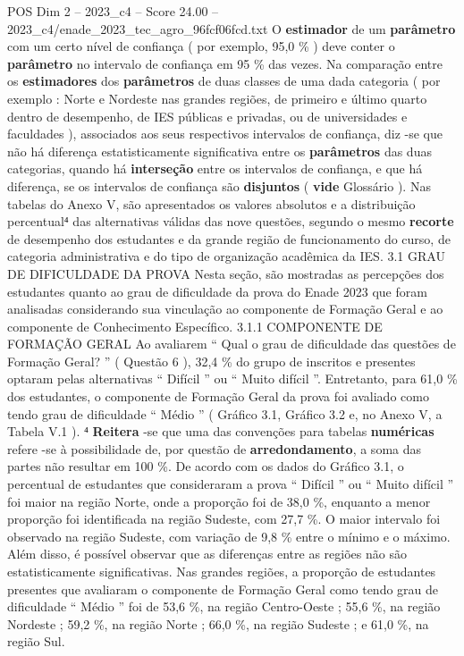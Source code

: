 \begin{textsample}{POS Dim 2 – 2023\_c4 – Score 24.00 – 2023\_c4/enade\_2023\_tec\_agro\_96fcf06fcd.txt}
O \textbf{estimador} de um \textbf{parâmetro} com um certo nível de confiança ( por exemplo, 95,0 \% ) deve conter o \textbf{parâmetro} no intervalo de confiança em 95 \% das vezes.
Na comparação entre os \textbf{estimadores} dos \textbf{parâmetros} de duas classes de uma dada categoria ( por exemplo : Norte e Nordeste nas grandes regiões, de primeiro e último quarto dentro de desempenho, de IES públicas e privadas, ou de universidades e faculdades ), associados aos seus respectivos intervalos de confiança, diz -se que não há diferença estatisticamente significativa entre os \textbf{parâmetros} das duas categorias, quando há \textbf{interseção} entre os intervalos de confiança, e que há diferença, se os intervalos de confiança são \textbf{disjuntos} ( \textbf{vide} Glossário ).
Nas tabelas do Anexo V, são apresentados os valores absolutos e a distribuição percentual⁴ das alternativas válidas das nove questões, segundo o mesmo \textbf{recorte} de desempenho dos estudantes e da grande região de funcionamento do curso, de categoria administrativa e do tipo de organização acadêmica da IES. 3.1 GRAU DE DIFICULDADE DA PROVA Nesta seção, são mostradas as percepções dos estudantes quanto ao grau de dificuldade da prova do Enade 2023 que foram analisadas considerando sua vinculação ao componente de Formação Geral e ao componente de Conhecimento Específico. 3.1.1 COMPONENTE DE FORMAÇÃO GERAL Ao avaliarem “ Qual o grau de dificuldade das questões de Formação Geral? ” ( Questão 6 ), 32,4 \% do grupo de inscritos e presentes optaram pelas alternativas “ Difícil ” ou “ Muito difícil ”.
Entretanto, para 61,0 \% dos estudantes, o componente de Formação Geral da prova foi avaliado como tendo grau de dificuldade “ Médio ” ( Gráfico 3.1, Gráfico 3.2 e, no Anexo V, a Tabela V.1 ). ⁴ \textbf{Reitera} -se que uma das convenções para tabelas \textbf{numéricas} refere -se à possibilidade de, por questão de \textbf{arredondamento}, a soma das partes não resultar em 100 \%.
De acordo com os dados do Gráfico 3.1, o percentual de estudantes que consideraram a prova “ Difícil ” ou “ Muito difícil ” foi maior na região Norte, onde a proporção foi de 38,0 \%, enquanto a menor proporção foi identificada na região Sudeste, com 27,7 \%.
O maior intervalo foi observado na região Sudeste, com variação de 9,8 \% entre o mínimo e o máximo.
Além disso, é possível observar que as diferenças entre as regiões não são estatisticamente significativas.
Nas grandes regiões, a proporção de estudantes presentes que avaliaram o componente de Formação Geral como tendo grau de dificuldade “ Médio ” foi de 53,6 \%, na região Centro-Oeste ; 55,6 \%, na região Nordeste ; 59,2 \%, na região Norte ; 66,0 \%, na região Sudeste ; e 61,0 \%, na região Sul.

\end{textsample}
